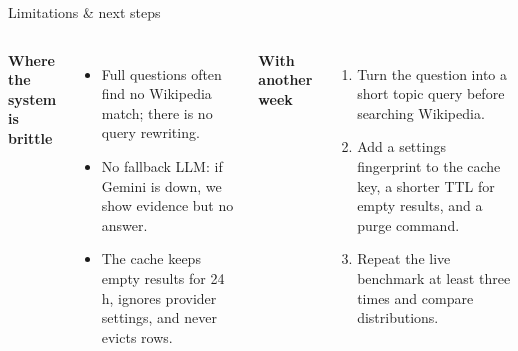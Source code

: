 \documentclass[aspectratio=169,11pt]{beamer}
\begin{document}
\begin{frame}{Limitations \& next steps}
  \begin{columns}[T,onlytextwidth]
  {\large\bfseries\color{amber}Where the system is brittle}
  \begin{itemize}\setlength\itemsep{0.5em}
    \item Full questions often find no Wikipedia match; there is no query rewriting.
    \item No fallback LLM: if Gemini is down, we show evidence but no answer.
    \item The cache keeps empty results for 24\,h, ignores provider settings, and never
      evicts rows.
  \end{itemize}

  {\large\bfseries\color{ok}With another week}
  \begin{enumerate}\setlength\itemsep{0.5em}
    \item Turn the question into a short topic query before searching Wikipedia.
    \item Add a settings fingerprint to the cache key, a shorter TTL for empty results, and a
      purge command.
    \item Repeat the live benchmark at least three times and compare distributions.
  \end{enumerate}
  \end{columns}
\end{frame}
\end{document}
